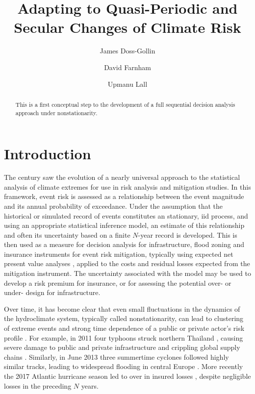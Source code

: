 \documentclass[12pt]{article}
\title{Adapting to Quasi-Periodic and Secular Changes of Climate Risk}
\author[1,2]{James Doss-Gollin}
\author[1,2]{David Farnham}
\author[1,2]{Upmanu Lall}
\affil[1]{Columbia Water Center, Columbia University}
\affil[2]{Department of Earth and Environmental Engineering, Columbia University}
\begin{document}
\maketitle
\RaggedRight{}
\begin{abstract}
  This is a first conceptual step to the development of a full sequential decision analysis approach under nonstationarity.
\end{abstract}


\section{Introduction}\label{sec:introduction}

The  century saw the evolution of a nearly universal approach to the statistical analysis of climate extremes for use in risk analysis and mitigation studies. 
In this framework, event risk is assessed as a relationship between the event magnitude and its annual probability of exceedance.
Under the assumption that the historical or simulated record of events constitutes an stationary, \gls{iid} process, and using an appropriate statistical inference model, an estimate of this relationship and often its uncertainty based on a finite $N$-year record is developed.
This is then used as a measure for decision analysis for infrastructure, flood zoning and insurance instruments for event risk mitigation, typically using expected net present value analyses \citep[\ie{}][]{Rosner2014}, applied to the costs and residual losses expected from the mitigation instrument.
The uncertainty associated with the model may be used to develop a risk premium for insurance, or for assessing the potential over- or under- design for infrastructure.

Over time, it has become clear that even small fluctuations in the dynamics of the hydroclimate system, typically called nonstationarity, can lead to clustering of extreme events  and strong time dependence of a public or private actor's risk profile \citep{Bonnafous2017a,Bonnafous2017b}.
For example, in 2011 four typhoons struck northern Thailand \citep{Gale2013}, causing severe damage to public and private infrastructure and crippling global supply chains \citep{Haraguchi2015}.
Similarly, in June 2013 three summertime cyclones followed highly similar tracks, leading to widespread flooding in central Europe \citep{Grams2014}.
More recently the 2017 Atlantic hurricane season led to over  in insured losses \citep{SwissRe2017}, despite negligible losses in the preceding $N$ years.
\end{document}
